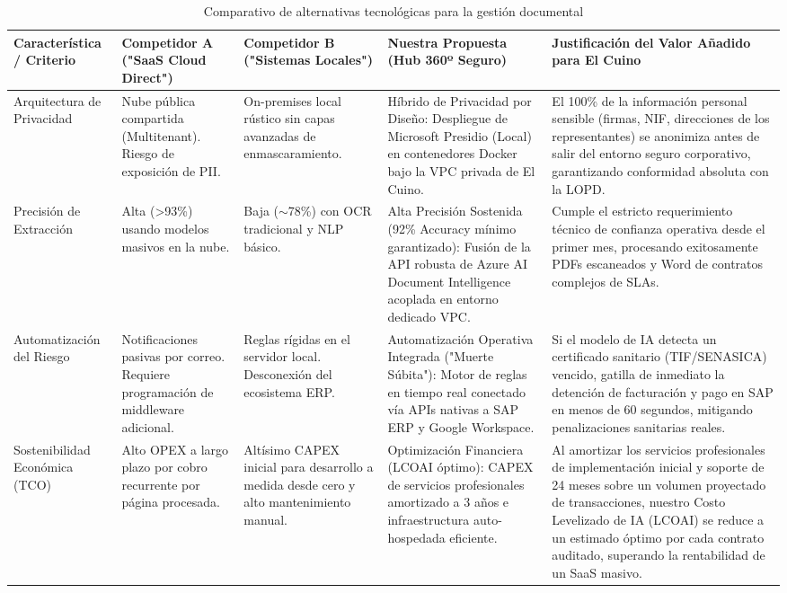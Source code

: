 \documentclass[12pt]{article}
\begin{document}
\footnotesize
\setlength{\tabcolsep}{3pt}
\renewcommand{\arraystretch}{1.2}
\begin{xltabular}{\textwidth}{|p{2.8cm}|>{\raggedright\arraybackslash}X|>{\raggedright\arraybackslash}X|>{\raggedright\arraybackslash}X|>{\raggedright\arraybackslash}X|}
\caption{Comparativo de alternativas tecnológicas para la gestión documental}\label{tab:comparativo-alternativas}\\
\hline
\textbf{Característica / Criterio} & \textbf{Competidor A ("SaaS Cloud Direct")} & \textbf{Competidor B ("Sistemas Locales")} & \textbf{Nuestra Propuesta (Hub 360º Seguro)} & \textbf{Justificación del Valor Añadido para El Cuino} \\
\hline
Arquitectura de Privacidad & Nube pública compartida (Multitenant). Riesgo de exposición de PII. & On-premises local rústico sin capas avanzadas de enmascaramiento. & Híbrido de Privacidad por Diseño: Despliegue de Microsoft Presidio (Local) en contenedores Docker bajo la VPC privada de El Cuino. & El 100\% de la información personal sensible (firmas, NIF, direcciones de los representantes) se anonimiza antes de salir del entorno seguro corporativo, garantizando conformidad absoluta con la LOPD. \\
\hline
Precisión de Extracción & Alta (\textgreater{}93\%) usando modelos masivos en la nube. & Baja ($\sim$78\%) con OCR tradicional y NLP básico. & Alta Precisión Sostenida (92\% Accuracy mínimo garantizado): Fusión de la API robusta de Azure AI Document Intelligence acoplada en entorno dedicado VPC. & Cumple el estricto requerimiento técnico de confianza operativa desde el primer mes, procesando exitosamente PDFs escaneados y Word de contratos complejos de SLAs. \\
\hline
Automatización del Riesgo & Notificaciones pasivas por correo. Requiere programación de middleware adicional. & Reglas rígidas en el servidor local. Desconexión del ecosistema ERP. & Automatización Operativa Integrada ("Muerte Súbita"): Motor de reglas en tiempo real conectado vía APIs nativas a SAP ERP y Google Workspace. & Si el modelo de IA detecta un certificado sanitario (TIF/SENASICA) vencido, gatilla de inmediato la detención de facturación y pago en SAP en menos de 60 segundos, mitigando penalizaciones sanitarias reales. \\
\hline
Sostenibilidad Económica (TCO) & Alto OPEX a largo plazo por cobro recurrente por página procesada. & Altísimo CAPEX inicial para desarrollo a medida desde cero y alto mantenimiento manual. & Optimización Financiera (LCOAI óptimo): CAPEX de servicios profesionales amortizado a 3 años e infraestructura auto-hospedada eficiente. & Al amortizar los servicios profesionales de implementación inicial y soporte de 24 meses sobre un volumen proyectado de transacciones, nuestro Costo Levelizado de IA (LCOAI) se reduce a un estimado óptimo por cada contrato auditado, superando la rentabilidad de un SaaS masivo. \\
\hline
\end{xltabular}
\normalsize
\end{document}
